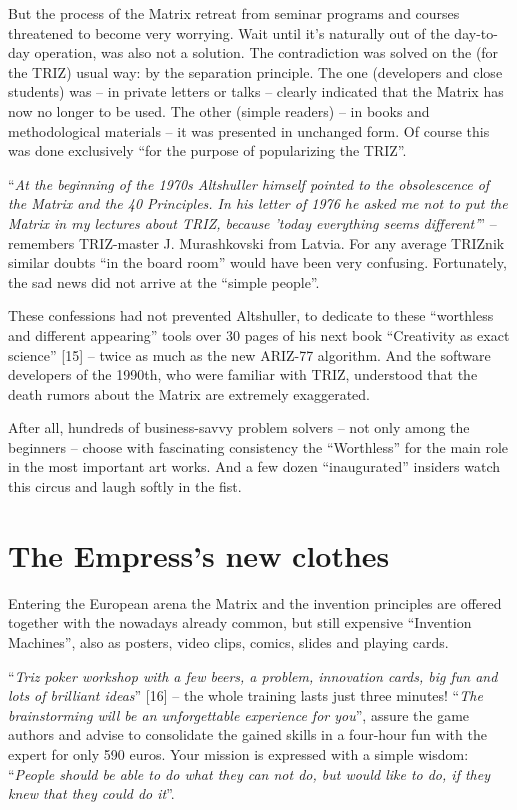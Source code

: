 \documentclass[11pt,a4paper]{article}
\begin{document}
But the process of the Matrix retreat from seminar programs and courses
threatened to become very worrying. Wait until it's naturally out of the
day-to-day operation, was also not a solution. The contradiction was solved on
the (for the TRIZ) usual way: by the separation principle. The one (developers
and close students) was -- in private letters or talks -- clearly indicated
that the Matrix has now no longer to be used. The other (simple readers) -- in
books and methodological materials -- it was presented in unchanged form. Of
course this was done exclusively ``for the purpose of popularizing the TRIZ''.

``\emph{At the beginning of the 1970s Altshuller himself pointed to the
  obsolescence of the Matrix and the 40 Principles. In his letter of 1976 he
  asked me not to put the Matrix in my lectures about TRIZ, because 'today
  everything seems different'}'' -- remembers TRIZ-master J. Murashkovski from
Latvia. For any average TRIZnik similar doubts ``in the board room'' would
have been very confusing. Fortunately, the sad news did not arrive at the
``simple people''.

These confessions had not prevented Altshuller, to dedicate to these
``worthless and different appearing'' tools over 30 pages of his next book
``Creativity as exact science'' [15] -- twice as much as the new ARIZ-77
algorithm. And the software developers of the 1990th, who were familiar with
TRIZ, understood that the death rumors about the Matrix are extremely
exaggerated.

After all, hundreds of business-savvy problem solvers -- not only among the
beginners -- choose with fascinating consistency the ``Worthless'' for the
main role in the most important art works. And a few dozen ``inaugurated''
insiders watch this circus and laugh softly in the fist.

\section*{The Empress's new clothes}
Entering the European arena the Matrix and the invention principles are
offered together with the nowadays already common, but still expensive
``Invention Machines'', also as posters, video clips, comics, slides and
playing cards.

``\emph{Triz poker workshop with a few beers, a problem, innovation cards, big
  fun and lots of brilliant ideas}'' [16] -- the whole training lasts just
three minutes!  ``\emph{The brainstorming will be an unforgettable experience
  for you}'', assure the game authors and advise to consolidate the gained
skills in a four-hour fun with the expert for only 590 euros. Your mission is
expressed with a simple wisdom: ``\emph{People should be able to do what they
  can not do, but would like to do, if they knew that they could do it}''.
\end{document}

